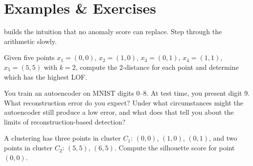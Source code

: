 \newpage

\section{Examples \& Exercises}

 builds the intuition that no anomaly score can replace.
Step through the arithmetic slowly.

\vspace{1em}

Given five points $x_1{=}(0,0)$, $x_2{=}(1,0)$, $x_3{=}(0,1)$, $x_4{=}(1,1)$, $x_5{=}(5,5)$ with $k{=}2$, compute the 2-distance for each point and determine which has the highest LOF.


\vspace{2.5em}

 You train an autoencoder on MNIST digits 0--8.
At test time, you present digit 9.
What reconstruction error do you expect?
Under what circumstances might the autoencoder still produce a low error, and what does that tell you about the limits of reconstruction-based detection?


\vspace{2.5em}

A clustering has three points in cluster $C_1$: $(0,0)$, $(1,0)$, $(0,1)$, and two points in cluster $C_2$: $(5,5)$, $(6,5)$.
Compute the silhouette score for point $(0,0)$.


